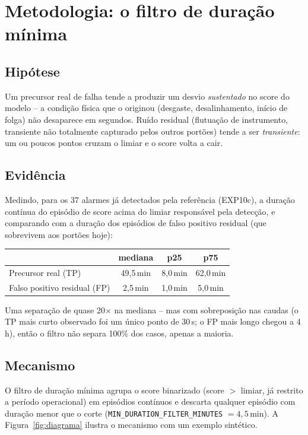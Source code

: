 \documentclass[11pt,a4paper]{article}
\begin{document}
\section{Metodologia: o filtro de duração mínima}
\label{sec:metodologia}

\subsection{Hipótese}
Um precursor real de falha tende a produzir um desvio \emph{sustentado}
no score do modelo -- a condição física que o originou (desgaste,
desalinhamento, início de folga) não desaparece em segundos. Ruído
residual (flutuação de instrumento, transiente não totalmente
capturado pelos outros portões) tende a ser \emph{transiente}: um ou
poucos pontos cruzam o limiar e o score volta a cair.

\subsection{Evidência}
Medindo, para os 37 alarmes já detectados pela referência (EXP10c), a
duração contínua do episódio de score acima do limiar responsável pela
detecção, e comparando com a duração dos episódios de falso positivo
residual (que sobrevivem aos portões hoje):

\begin{center}
\begin{tabular}{lccc}
\toprule
& mediana & p25 & p75 \\
\midrule
Precursor real (TP) & 49,5\,min & 8,0\,min & 62,0\,min \\
Falso positivo residual (FP) & 2,5\,min & 1,0\,min & 5,0\,min \\
\bottomrule
\end{tabular}
\end{center}

Uma separação de quase 20$\times$ na mediana -- mas com sobreposição
nas caudas (o TP mais curto observado foi um único ponto de 30\,s; o FP
mais longo chegou a 4\,h), então o filtro não separa 100\% dos casos,
apenas a maioria.

\subsection{Mecanismo}
O filtro de duração mínima agrupa o score binarizado (score $>$
limiar, já restrito a período operacional) em episódios contínuos e
descarta qualquer episódio com duração menor que o corte
(\texttt{MIN\_DURATION\_FILTER\_MINUTES} $= 4{,}5$\,min). A
Figura~\ref{fig:diagrama} ilustra o mecanismo com um exemplo sintético.
\end{document}
